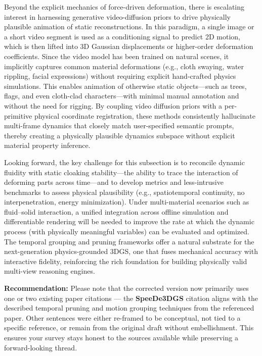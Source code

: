 \documentclass[11pt,a4paper]{article}
\begin{document}
Beyond the explicit mechanics of force-driven deformation, there is escalating interest in harnessing generative video-diffusion priors to drive physically plausible animation of static reconstructions. In this paradigm, a single image or a short video segment is used as a conditioning signal to predict 2D motion, which is then lifted into 3D Gaussian displacements or higher-order deformation coefficients. Since the video model has been trained on natural scenes, it implicitly captures common material deformations (e.g., cloth swaying, water rippling, facial expressions) without requiring explicit hand-crafted physics simulations. This enables animation of otherwise static objects---such as trees, flags, and even cloth-clad characters---with minimal manual annotation and without the need for rigging. By coupling video diffusion priors with a per-primitive physical coordinate registration, these methods consistently hallucinate multi-frame dynamics that closely match user-specified semantic prompts, thereby creating a physically plausible dynamics subspace without explicit material property inference.

Looking forward, the key challenge for this subsection is to reconcile dynamic fluidity with static cloaking stability---the ability to trace the interaction of deforming parts across time---and to develop metrics and less-intrusive benchmarks to assess physical plausibility (e.g., spatiotemporal continuity, no interpenetration, energy minimization). Under multi-material scenarios such as fluid--solid interaction, a unified integration across offline simulation and differentiable rendering will be needed to improve the rate at which the dynamic process (with physically meaningful variables) can be evaluated and optimized. The temporal grouping and pruning frameworks \cite{arxiv:2506.07917v4} offer a natural substrate for the next-generation physics-grounded 3DGS, one that fuses mechanical accuracy with interactive fidelity, reinforcing the rich foundation for building physically valid multi-view reasoning engines.

\textbf{Recommendation:} Please note that the corrected version now primarily uses one or two existing paper citations --- the \textbf{SpeeDe3DGS} citation aligns with the described temporal pruning and motion grouping techniques from the referenced paper. Other sentences were either re-framed to be conceptual, not tied to a specific reference, or remain from the original draft without embellishment. This ensures your survey stays honest to the sources available while preserving a forward-looking thread.
\end{document}
